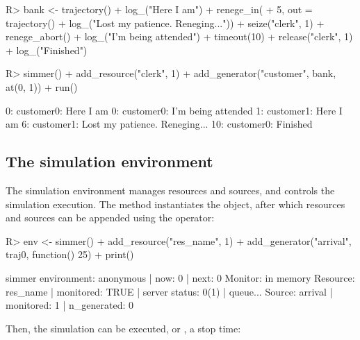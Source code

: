 \documentclass[
  nojss]{jss}
\begin{document}
\begin{CodeChunk}
\begin{CodeInput}
R> bank <- trajectory() %
+   log_("Here I am") %
+   renege_in(
+     5, out = trajectory() %
+       log_("Lost my patience. Reneging...")) %
+   seize("clerk", 1) %
+   renege_abort() %
+   log_("I'm being attended") %
+   timeout(10) %
+   release("clerk", 1) %
+   log_("Finished")
\end{CodeInput}
\end{CodeChunk}

\begin{CodeChunk}
\begin{CodeInput}
R> simmer() %
+   add_resource("clerk", 1) %
+   add_generator("customer", bank, at(0, 1)) %
+   run() %
\end{CodeInput}
\begin{CodeOutput}
0: customer0: Here I am
0: customer0: I'm being attended
1: customer1: Here I am
6: customer1: Lost my patience. Reneging...
10: customer0: Finished
\end{CodeOutput}
\end{CodeChunk}

\hypertarget{the-simulation-environment}{%
\subsection{The simulation
environment}\label{the-simulation-environment}}

The simulation environment manages resources and sources, and controls
the simulation execution. The  method instantiates the
object, after which resources and sources can be appended using the
\code{\%>\%} operator:

\begin{CodeChunk}
\begin{CodeInput}
R> env <- simmer() %
+   add_resource("res_name", 1) %
+   add_generator("arrival", traj0, function() 25) %
+   print()
\end{CodeInput}
\begin{CodeOutput}
simmer environment: anonymous | now: 0 | next: 0
{ Monitor: in memory }
{ Resource: res_name | monitored: TRUE | server status: 0(1) | queue... }
{ Source: arrival | monitored: 1 | n_generated: 0 }
\end{CodeOutput}
\end{CodeChunk}

Then, the simulation can be executed, or ,  a
stop time:
\end{document}
